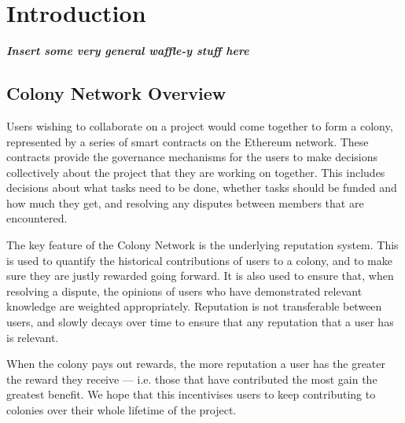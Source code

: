 \section{Introduction}


\textbf{\emph{Insert some very general waffle-y stuff here}}

\subsection{Colony Network Overview}

Users wishing to collaborate on a project would come together to form a colony, represented by a series of smart contracts on the Ethereum network. These contracts provide the governance mechanisms for the users to make decisions collectively about the project that they are working on together. This includes decisions about what tasks need to be done, whether tasks should be funded and how much they get, and resolving any disputes between members that are encountered.

The key feature of the Colony Network is the underlying reputation system. This is used to quantify the historical contributions of users to a colony, and to make sure they are justly rewarded going forward. It is also used to ensure that, when resolving a dispute, the opinions of users who have demonstrated relevant knowledge are weighted appropriately. Reputation is not transferable between users, and slowly decays over time to ensure that any reputation that a user has is relevant.

When the colony pays out rewards, the more reputation a user has the greater the reward they receive --- i.e. those that have contributed the most gain the greatest benefit. We hope that this incentivises users to keep contributing to colonies over their whole lifetime of the project.
